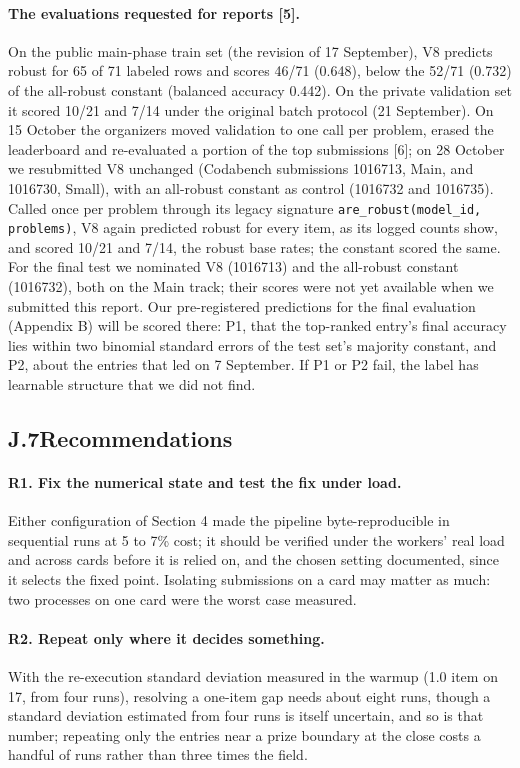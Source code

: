 \paragraph{The evaluations requested for reports [5].}
On the public main-phase train set (the revision of 17 September), V8 predicts robust for 65 of 71 labeled rows and scores 46/71 (0.648), below the 52/71 (0.732) of the all-robust constant (balanced accuracy 0.442). On the private validation set it scored 10/21 and 7/14 under the original batch protocol (21 September). On 15 October the organizers moved validation to one call per problem, erased the leaderboard and re-evaluated a portion of the top submissions [6]; on 28 October we resubmitted V8 unchanged (Codabench submissions 1016713, Main, and 1016730, Small), with an all-robust constant as control (1016732 and 1016735). Called once per problem through its legacy signature \texttt{are\_robust(model\_id, problems)}, V8 again predicted robust for every item, as its logged counts show, and scored 10/21 and 7/14, the robust base rates; the constant scored the same. For the final test we nominated V8 (1016713) and the all-robust constant (1016732), both on the Main track; their scores were not yet available when we submitted this report. Our pre-registered predictions for the final evaluation (Appendix B) will be scored there: P1, that the top-ranked entry's final accuracy lies within two binomial standard errors of the test set's majority constant, and P2, about the entries that led on 7 September. If P1 or P2 fail, the label has learnable structure that we did not find.

\subsection*{J.7\quad Recommendations}

\paragraph{R1. Fix the numerical state and test the fix under load.}
Either configuration of Section 4 made the pipeline byte-reproducible in sequential runs at 5 to 7\% cost; it should be verified under the workers' real load and across cards before it is relied on, and the chosen setting documented, since it selects the fixed point. Isolating submissions on a card may matter as much: two processes on one card were the worst case measured.

\paragraph{R2. Repeat only where it decides something.}
With the re-execution standard deviation measured in the warmup (1.0 item on 17, from four runs), resolving a one-item gap needs about eight runs, though a standard deviation estimated from four runs is itself uncertain, and so is that number; repeating only the entries near a prize boundary at the close costs a handful of runs rather than three times the field.

